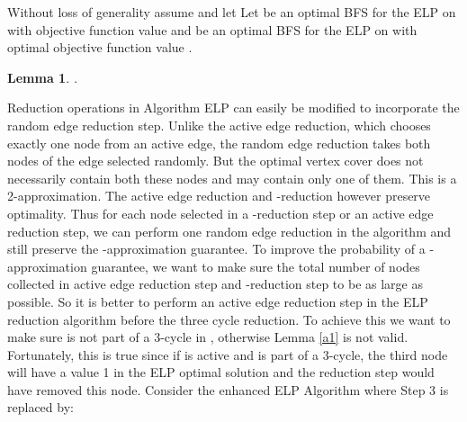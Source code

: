 \documentclass[12pt]{article}
\newtheorem{lemma}{Lemma}
\begin{document}
\vskip 5pt

Without loss of generality assume  and let
  Let  be an  optimal BFS for the ELP on  with objective
function value  and  be an optimal BFS for the ELP on  with
optimal objective function value .

\begin{lemma}\label{3c5}.\end{lemma}

Reduction operations in Algorithm ELP can easily be modified to
incorporate the random edge reduction step. Unlike the active edge
reduction, which chooses exactly one node from an active edge, the
random edge reduction takes both nodes of the edge selected
randomly. But the optimal vertex cover does not necessarily contain
both these nodes and may contain only one of them. This is a
2-approximation. The active edge reduction and -reduction
however preserve optimality. Thus for each node selected in a
-reduction step or an active edge reduction step, we can
perform one random edge reduction in the algorithm and still
preserve the -approximation guarantee. To improve the
probability of a -approximation guarantee, we want to
make sure the total number of nodes collected in active edge
reduction step and -reduction step to be as large as
possible. So it is better to perform an active edge reduction step
in the ELP reduction algorithm before the three cycle reduction. To
achieve this we want to make sure  is not part of a 3-cycle
in , otherwise Lemma \ref{a1} is not valid. Fortunately, this
is true since if  is active and is part of a 3-cycle, the
third node will have a value 1 in the ELP optimal solution and the
 reduction step would have removed this node. Consider the
enhanced ELP Algorithm where
Step 3 is replaced by:\\
\end{document}
